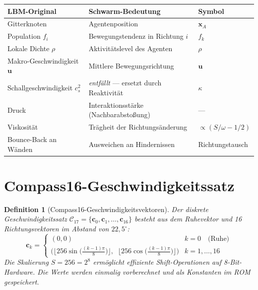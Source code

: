 \documentclass[11pt,a4paper]{article}
\newtheorem{definition}{Definition}
\newcommand{\floor}[1]{\lfloor #1 \rfloor}
\begin{document}
\begin{center}
\begin{tabular}{@{}lll@{}}
\toprule
\textbf{LBM-Original} & \textbf{Schwarm-Bedeutung} & \textbf{Symbol} \\
\midrule
Gitterknoten & Agentenposition & $\mathbf{x}_A$ \\
Population $f_i$ & Bewegungstendenz in Richtung $i$ & $f_k$ \\
Lokale Dichte $\rho$ & Aktivit\"atslevel des Agenten & $\rho$ \\
Makro-Geschwindigkeit $\mathbf{u}$ & Mittlere Bewegungsrichtung & $\mathbf{u}$ \\
Schallgeschwindigkeit $c_s^2$ & \textit{entf\"allt} --- ersetzt durch Reaktivit\"at & $\kappa$ \\
Druck & Interaktionsst\"arke (Nachbarabsto\ss ung) & --- \\
Viskosit\"at & Tr\"agheit der Richtungs\"anderung & $\propto (S/\omega - 1/2)$ \\
Bounce-Back an W\"anden & Ausweichen an Hindernissen & Richtungstausch \\
\bottomrule
\end{tabular}
\end{center}

\section{Compass16-Geschwindigkeitssatz}

\begin{definition}[Compass16-Geschwindigkeitsvektoren]
Der diskrete Geschwindigkeitssatz $\mathcal{C}_{17} = \{\mathbf{c}_0, \mathbf{c}_1, \ldots, \mathbf{c}_{16}\}$
besteht aus dem Ruhevektor und 16 Richtungsvektoren im Abstand von $22{,}5^\circ$:
\begin{equation}
\mathbf{c}_k = 
\begin{cases}
(0, 0) & k = 0 \quad \text{(Ruhe)} \\[4pt]
\displaystyle\Big(\floor{256\sin\big(\tfrac{(k-1)\pi}{8}\big)},\;\;
\floor{256\cos\big(\tfrac{(k-1)\pi}{8}\big)}\Big) & k = 1,\ldots,16
\end{cases}
\end{equation}
Die Skalierung $S = 256 = 2^8$ erm\"oglicht effiziente Shift-Operationen auf 8-Bit-Hardware.
Die Werte werden einmalig vorberechnet und als Konstanten im ROM gespeichert.
\end{definition}
\end{document}
